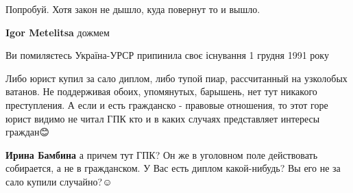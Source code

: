 \begin{itemize}
\begin{itemize}
\end{itemize}

 
Попробуй. Хотя закон не дышло, куда повернут то и вышло.

\begin{itemize}
 
\textbf{Igor Metelitsa} дожмем
\end{itemize}

 
Ви помиляєтесь Україна-УРСР припинила своє існування 1 грудня 1991 року


Либо юрист купил за сало диплом, либо тупой пиар, рассчитанный на узколобых
ватанов. Не поддерживая обоих, упомянутых, барышень, нет тут никакого
преступления. А если и есть гражданско - правовые отношения, то этот горе юрист
видимо не читал ГПК кто и в каких случаях представляет интересы граждан😊

\begin{itemize}
 
\textbf{Ирина Бамбина} а причем тут ГПК? Он же в уголовном поле действовать собирается, а не в гражданском. У Вас есть диплом какой-нибудь? Вы его не за сало купили случайно?☺

 

\end{itemize}
\end{itemize}
